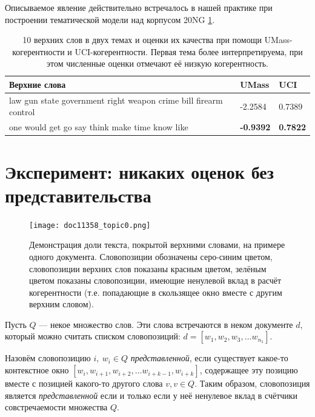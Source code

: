Описываемое явление действительно встречалось в нашей практике при построении тематической модели над корпусом 20NG \ref{fig:law_gun_would}.

\begin{table}[t]
    \caption{10 верхних слов в двух темах и оценки их качества при помощи UMass-когерентности и UCI-когерентности. Первая тема более интерпретируема, при этом численные оценки отмечают её низкую когерентность.}
    \label{fig:law_gun_would}
    \small
    \begin{tabular}{ | p{7.5cm}| p{3.5cm} |p{3.5cm} |}
    \hline
    Верхние слова &  UMass & UCI
    \\ \hline	
law gun state government right weapon crime bill firearm control &
-2.2584 & 0.7389
    \\ \hline
one would get go say think make time know like & \textbf{-0.9392} & \textbf{0.7822}
    \\ \hline
    \end{tabular}
\end{table}

\section{Эксперимент: никаких оценок без представительства}
\label{sec:represented}


\begin{figure}
        \texttt{[image: doc11358\_topic0.png]} %
    \caption{Демонстрация доли текста, покрытой верхними словами, на примере одного документа. Словопозиции обозначены серо-синим цветом, словопозиции верхних слов показаны красным цветом, зелёным цветом показаны словопозиции, имеющие ненулевой вклад в расчёт когерентности (т.е. попадающие в скользящее окно вместе с другим верхним словом).}
\label{fig:ch3_doc_compound}
\end{figure}


Пусть $Q$ --- некое множество слов. Эти слова встречаются в неком документе $d$, который можно считать списком словопозиций: $d = [w_1, w_2, w_3, \dots w_{n_1}]$.

Назовём словопозицию $i, ~w_i \in Q$ \textit{представленной}, если существует какое-то контекстное окно $[w_i, w_{i+1}, w_{i+2}, \dots w_{i+k-1}, w_{i+k}]$, содержащее эту позицию вместе с позицией какого-то другого слова $v, v \in Q$. Таким образом, словопозиция является \textit{представленной} если и только если у неё ненулевое вклад в счётчики совстречаемости множества $Q$.


